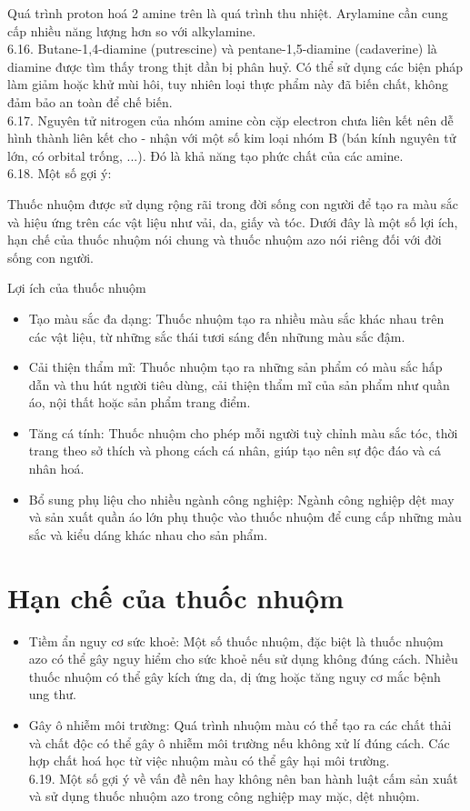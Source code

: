\documentclass[10pt]{article}
\begin{document}
Quá trình proton hoá 2 amine trên là quá trình thu nhiệt. Arylamine cần cung cấp nhiều năng lượng hơn so với alkylamine.\\
6.16. Butane-1,4-diamine (putrescine) và pentane-1,5-diamine (cadaverine) là diamine được tìm thấy trong thịt dần bị phân huỷ. Có thể sử dụng các biện pháp làm giảm hoặc khử mùi hôi, tuy nhiên loại thực phẩm này đã biến chất, không đảm bảo an toàn để chế biến.\\
6.17. Nguyên tử nitrogen của nhóm amine còn cặp electron chưa liên kết nên dễ hình thành liên kết cho - nhận với một số kim loại nhóm B (bán kính nguyên tử lớn, có orbital trống, ...). Đó là khả năng tạo phức chất của các amine.\\
6.18. Một số gợi ý:

Thuốc nhuộm được sử dụng rộng rãi trong đời sống con người để tạo ra màu sắc và hiệu ứng trên các vật liệu như vải, da, giấy và tóc. Dưới đây là một số lợi ích, hạn chế của thuốc nhuộm nói chung và thuốc nhuộm azo nói riêng đối với đời sống con người.

Lợi ích của thuốc nhuộm

\begin{itemize}
  \item Tạo màu sắc đa dạng: Thuốc nhuộm tạo ra nhiều màu sắc khác nhau trên các vật liệu, từ những sắc thái tươi sáng đến nhữung màu sắc đậm.
  \item Cải thiện thẩm mĩ: Thuốc nhuộm tạo ra những sản phẩm có màu sắc hấp dẫn và thu hút người tiêu dùng, cải thiện thẩm mĩ của sản phẩm như quần áo, nội thất hoặc sản phẩm trang điểm.
  \item Tăng cá tính: Thuốc nhuộm cho phép mỗi người tuỳ chỉnh màu sắc tóc, thời trang theo sở thích và phong cách cá nhân, giúp tạo nên sự độc đáo và cá nhân hoá.
  \item Bổ sung phụ liệu cho nhiều ngành công nghiệp: Ngành công nghiệp dệt may và sản xuất quần áo lớn phụ thuộc vào thuốc nhuộm để cung cấp những màu sắc và kiểu dáng khác nhau cho sản phẩm.
\end{itemize}

\section*{Hạn chế của thuốc nhuộm}
\begin{itemize}
  \item Tiềm ẩn nguy cơ sức khoẻ: Một số thuốc nhuộm, đặc biệt là thuốc nhuộm azo có thể gây nguy hiểm cho sức khoẻ nếu sử dụng không đúng cách. Nhiều thuốc nhuộm có thể gây kích ứng da, dị ứng hoặc tăng nguy cơ mắc bệnh ung thư.
  \item Gây ô nhiễm môi trường: Quá trình nhuộm màu có thể tạo ra các chất thải và chất độc có thể gây ô nhiễm môi trường nếu không xử lí đúng cách. Các hợp chất hoá học từ việc nhuộm màu có thể gây hại môi trường.\\
6.19. Một số gợi ý về vấn đề nên hay không nên ban hành luật cấm sản xuất và sử dụng thuốc nhuộm azo trong công nghiệp may mặc, dệt nhuộm.
\end{itemize}
\end{document}
